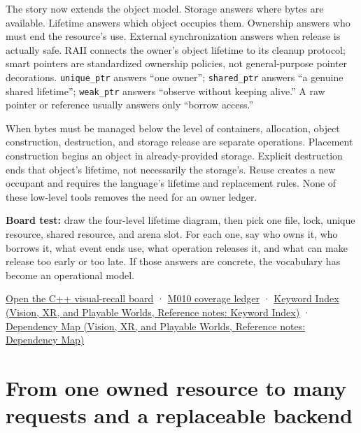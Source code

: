 \hypertarget{05-engine-i-ch004-the-teaching-summary-ask-who-until-when-by-which-release}{}

The story now extends the object model. Storage answers where bytes are available. Lifetime answers which object occupies them. Ownership answers who must end the resource's use. External synchronization answers when release is actually safe. RAII connects the owner's object lifetime to its cleanup protocol; smart pointers are standardized ownership policies, not general-purpose pointer decorations. \texttt{unique\_ptr} answers ``one owner''; \texttt{shared\_ptr} answers ``a genuine shared lifetime''; \texttt{weak\_ptr} answers ``observe without keeping alive.'' A raw pointer or reference usually answers only ``borrow access.''

When bytes must be managed below the level of containers, allocation, object construction, destruction, and storage release are separate operations. Placement construction begins an object in already-provided storage. Explicit destruction ends that object's lifetime, not necessarily the storage's. Reuse creates a new occupant and requires the language's lifetime and replacement rules. None of these low-level tools removes the need for an owner ledger.

\textbf{Board test:} draw the four-level lifetime diagram, then pick one file, lock, unique resource, shared resource, and arena slot. For each one, say who owns it, who borrows it, what event ends use, what operation releases it, and what can make release too early or too late. If those answers are concrete, the vocabulary has become an operational model.

\hyperref[appendix-960160274237]{Open the C++ visual-recall board} · \hyperref[appendix-fd090d982a15-m010---parts-148-160]{M010 coverage ledger} · \href{../07-Vision-XR-and-Playable-Worlds/main.pdf\#nameddest=appendix-a6d556a4ef50}{Keyword Index (Vision, XR, and Playable Worlds, Reference notes: Keyword Index)} · \href{../07-Vision-XR-and-Playable-Worlds/main.pdf\#nameddest=appendix-4ad47bdd269a}{Dependency Map (Vision, XR, and Playable Worlds, Reference notes: Dependency Map)}

\section{From one owned resource to many requests and a replaceable backend}\label{05-engine-i-ch004-from-one-owned-resource-to-many-requests-and-a-replaceable-backend}

